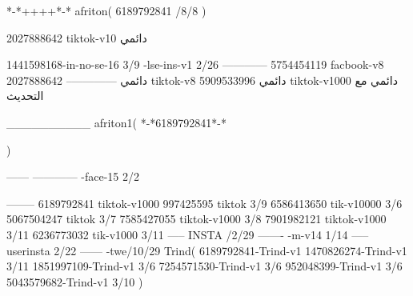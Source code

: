 *-*++++*-*
afriton(
6189792841 /8/8
)

2027888642 tiktok-v10
دائمي

1441598168-in-no-se-16 3/9
-lse-ins-v1 2/26
------------
5754454119 facbook-v8
دائمي
--------------
2027888642 tiktok-v8
دائمي
5909533996 tiktok-v1000
دائمي مع التحديث

__________
afriton1(
*-*6189792841*-*

)


------
------------
-face-15 2/2

--------
6189792841 tiktok-v1000
997425595 tiktok 3/9
6586413650 tik-v10000 3/6
5067504247 tiktok 3/7
7585427055 tiktok-v1000 3/8
7901982121 tiktok-v1000 3/11
6236773032 tik-v1000 3/11
-----
 INSTA /2/29
-------
-m-v14 1/14
-----
userinsta 2/22
------
-twe/10/29
Trind(
6189792841-Trind-v1 
1470826274-Trind-v1 3/11
1851997109-Trind-v1 3/6
7254571530-Trind-v1 3/6
952048399-Trind-v1 3/6
5043579682-Trind-v1 3/10
)
